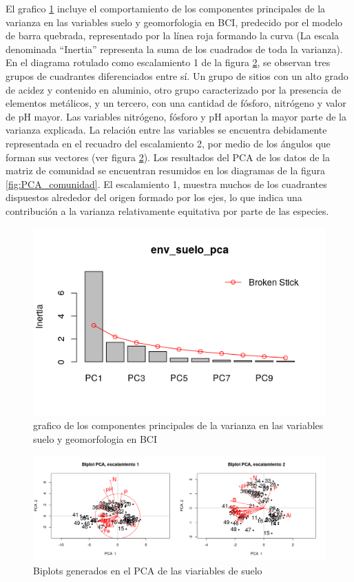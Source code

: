 \documentclass[11pt,]{article}
\begin{document}
El grafico \ref{fig:env_suelo_pca} incluye el comportamiento de los
componentes principales de la varianza en las variables suelo y
geomorfologia en BCI, predecido por el modelo de barra quebrada,
representado por la línea roja formando la curva (La escala denominada
``Inertia'' representa la suma de los cuadrados de toda la varianza). En
el diagrama rotulado como escalamiento 1 de la figura
\ref{fig:Biplot_PCA_escalamiento}, se observan tres grupos de cuadrantes
diferenciados entre sí. Un grupo de sitios con un alto grado de acidez y
contenido en aluminio, otro grupo caracterizado por la presencia de
elementos metálicos, y un tercero, con una cantidad de fósforo,
nitrógeno y valor de pH mayor. Las variables nitrógeno, fósforo y pH
aportan la mayor parte de la varianza explicada. La relación entre las
variables se encuentra debidamente representada en el recuadro del
escalamiento 2, por medio de los ángulos que forman sus vectores (ver
figura \ref{fig:Biplot_PCA_escalamiento}). Los resultados del PCA de los
datos de la matriz de comunidad se encuentran resumidos en los diagramas
de la figura \ref{fig:PCA_comunidad}. El escalamiento 1, muestra muchos
de los cuadrantes dispuestos alrededor del origen formado por los ejes,
lo que indica una contribución a la varianza relativamente equitativa
por parte de las especies.

\begin{figure}
\centering
\includegraphics{env_suelo_pca.png}
\caption{grafico de los componentes principales de la varianza en las
variables suelo y geomorfologia en BCI \label{fig:env_suelo_pca}}
\end{figure}

\begin{figure}
\centering
\includegraphics[width=1.00000\textwidth]{Biplot_PCA_escalamiento_actualizado.png}
\caption{Biplots generados en el PCA de las viariables de suelo
\label{fig:Biplot_PCA_escalamiento}}
\end{figure}
\end{document}
